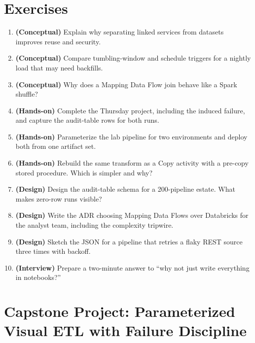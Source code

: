 \section{Exercises}
\begin{enumerate}
    \item \textbf{(Conceptual)} Explain why separating linked services from datasets improves reuse and security.
    \item \textbf{(Conceptual)} Compare tumbling-window and schedule triggers for a nightly load that may need backfills.
    \item \textbf{(Conceptual)} Why does a Mapping Data Flow join behave like a Spark shuffle?
    \item \textbf{(Hands-on)} Complete the Thursday project, including the induced failure, and capture the audit-table rows for both runs.
    \item \textbf{(Hands-on)} Parameterize the lab pipeline for two environments and deploy both from one artifact set.
    \item \textbf{(Hands-on)} Rebuild the same transform as a Copy activity with a pre-copy stored procedure. Which is simpler and why?
    \item \textbf{(Design)} Design the audit-table schema for a 200-pipeline estate. What makes zero-row runs visible?
    \item \textbf{(Design)} Write the ADR choosing Mapping Data Flows over Databricks for the analyst team, including the complexity tripwire.
    \item \textbf{(Design)} Sketch the JSON for a pipeline that retries a flaky REST source three times with backoff.
    \item \textbf{(Interview)} Prepare a two-minute answer to ``why not just write everything in notebooks?''
\end{enumerate}

\section{Capstone Project: Parameterized Visual ETL with Failure Discipline}\label{sec:ch10-capstone}

